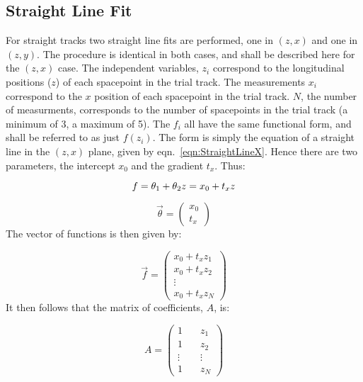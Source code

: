 \subsection{Straight Line Fit} For straight tracks two straight line fits are performed, one in $(z, x)$ and one in $(z, y)$. The procedure is identical in both cases, and shall be described here for the $(z, x)$ case.  The independent variables, $z_i$ correspond to the longitudinal positions ($z$) of each spacepoint in the trial track. The measurements $x_i$ correspond to the $x$ position of each spacepoint in the trial track. $N$, the number of measurments, corresponds to the number of spacepoints in the trial track (a minimum of 3, a maximum of 5). The $f_i$ all have the same functional form, and shall be referred to as just $f\left(z_i \right)$. The form is simply the equation of a straight line in the $(z, x)$ plane, given by eqn.~\ref{eqn:StraightLineX}.  Hence there are two parameters, the intercept $x_0$ and the gradient $t_x$. Thus:

\begin{equation}
  f = \theta_1 + \theta_2 z = x_0 + t_x z \\
\end{equation}

\begin{equation}
  \vec{\theta} =
  \begin{pmatrix}
    x_0 \\
    t_x
  \end{pmatrix}
\end{equation}
The vector of functions is then given by:

\begin{equation}
  \vec{f} = 
  \begin{pmatrix}
    x_0 + t_x z_1 \\
    x_0 + t_x z_2 \\
    \vdots \\
    x_0 + t_x z_N
  \end{pmatrix}
\end{equation}
It then follows that the matrix of coefficients, $A$, is:

\begin{equation}
  A =
  \begin{pmatrix}
    1 & \quad z_1 \\
    1 & \quad z_2 \\
    \vdots & \quad \vdots \\
    1 & \quad z_N
  \end{pmatrix}
\end{equation}

